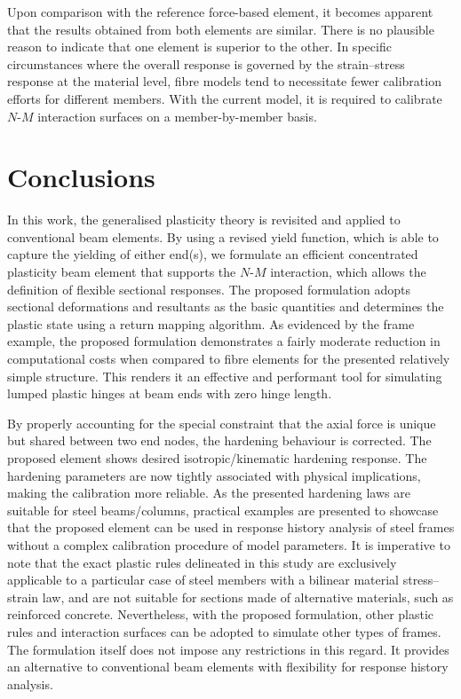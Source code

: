 Upon comparison with the reference force-based element, it becomes apparent that the results obtained from both elements are similar. There is no plausible reason to indicate that one element is superior to the other. In specific circumstances where the overall response is governed by the strain--stress response at the material level, fibre models tend to necessitate fewer calibration efforts for different members. With the current model, it is required to calibrate $N$-$M$ interaction surfaces on a member-by-member basis.
\section{Conclusions}
In this work, the generalised plasticity theory is revisited and applied to conventional beam elements.
By using a revised yield function, which is able to capture the yielding of either end(s), we formulate an efficient concentrated plasticity beam element that supports the $N$-$M$ interaction, which allows the definition of flexible sectional responses.
The proposed formulation adopts sectional deformations and resultants as the basic quantities and determines the plastic state using a return mapping algorithm.
As evidenced by the frame example, the proposed formulation demonstrates a fairly moderate reduction in computational costs when compared to fibre elements for the presented relatively simple structure.
This renders it an effective and performant tool for simulating lumped plastic hinges at beam ends with zero hinge length.

By properly accounting for the special constraint that the axial force is unique but shared between two end nodes, the hardening behaviour is corrected.
The proposed element shows desired isotropic/kinematic hardening response.
The hardening parameters are now tightly associated with physical implications, making the calibration more reliable.
As the presented hardening laws are suitable for steel beams/columns, practical examples are presented to showcase that the proposed element can be used in response history analysis of steel frames without a complex calibration procedure of model parameters.
It is imperative to note that the exact plastic rules delineated in this study are exclusively applicable to a particular case of steel members with a bilinear material stress--strain law, and are not suitable for sections made of alternative materials, such as reinforced concrete.
Nevertheless, with the proposed formulation, other plastic rules and interaction surfaces can be adopted to simulate other types of frames.
The formulation itself does not impose any restrictions in this regard.
It provides an alternative to conventional beam elements with flexibility for response history analysis.

